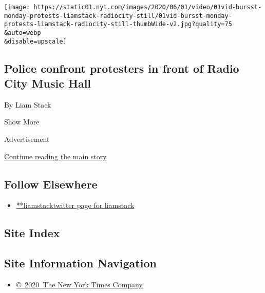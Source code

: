 \begin{enumerate}
  \texttt{[image: https://static01.nyt.com/images/2020/06/01/video/01vid-bursst-monday-protests-liamstack-radiocity-still/01vid-bursst-monday-protests-liamstack-radiocity-still-thumbWide-v2.jpg?quality=75\\\&auto=webp\\\&disable=upscale]}

  \hypertarget{police-confront-protesters-in-front-of-radio-city-music-hall}{%
  \subsection{Police confront protesters in front of Radio City Music
  Hall}\label{police-confront-protesters-in-front-of-radio-city-music-hall}}

  By Liam Stack
\end{enumerate}

Show More

Advertisement

\protect\hyperlink{after-mid2}{Continue reading the main story}

\hypertarget{follow-elsewhere}{%
\subsection{Follow Elsewhere}\label{follow-elsewhere}}

\begin{itemize}
\tightlist
\item
  \href{https://twitter.com/liamstack}{**liamstacktwitter page for
  liamstack}
\end{itemize}

\hypertarget{site-index}{%
\subsection{Site Index}\label{site-index}}

\hypertarget{site-information-navigation}{%
\subsection{Site Information
Navigation}\label{site-information-navigation}}

\begin{itemize}
\tightlist
\item
  \href{https://help.nytimes.com/hc/en-us/articles/115014792127-Copyright-notice}{©~2020~The
  New York Times Company}
\end{itemize}

